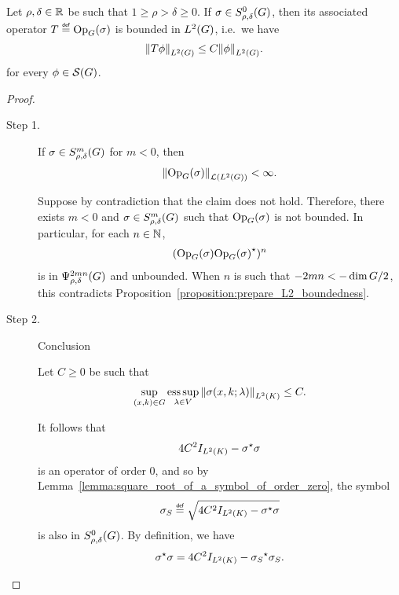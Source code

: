 \begin{proposition}[$L^2$ boundedness]
\label{proposition:L2_boundedness}
    Let $\rho, \delta \in \R$ be such that $1 \geq \rho > \delta \geq 0$.
    If $\sigma \in \SymbolClass 0 {\rho, \delta}$,
    then its associated operator $T \defeq \Op(\sigma)$ is bounded in $\Lebesgue 2 \Group$,
    i.e.\ we have
    \begin{align*}
        \norm [\Lebesgue 2 \Group] {T \phi} \leq C \norm [\Lebesgue 2 \Group] \phi.
    \end{align*}
    for every $\phi \in \Schwartz \Group$.
\end{proposition}
\begin{proof}
    \begin{description}
        \item[Step 1.] If $\sigma \in \SymbolClass m {\rho, \delta}$ for $m < 0$, then
            \begin{align*}
                \norm [\Lin{\Lebesgue 2 \Group}] {\Op(\sigma)} < \infty.
            \end{align*}

            Suppose by contradiction that the claim does not hold.
            Therefore, there exists $m < 0$ and $\sigma \in \SymbolClass m {\rho, \delta}$ such that
            $\Op(\sigma)$ is not bounded.
            In particular, for each $n \in \N$,
            \begin{align*}
                (\Op(\sigma) \adj {\Op(\sigma)})^n
            \end{align*}
            is in $\OperatorClass {2 m n} {\rho, \delta}$ and unbounded.
            When $n$ is such that $-2 m n < -\dim \Group / 2$, this contradicts
            Proposition~\ref{proposition:prepare_L2_boundedness}.
        \item[Step 2.] Conclusion

            Let $C \geq 0$ be such that
            \begin{align*}
                \sup_{(x, k) \in \Group} \esssup_{\lambda \in \VectorSpace} \norm [\Lebesgue 2 \CompactGroup] {\sigma(x, k; \lambda)} \leq C.
            \end{align*}

            It follows that
            \begin{align*}
                4 C^2 \Id {\Lebesgue 2 \CompactGroup} - \adj \sigma \sigma
            \end{align*}
            is an operator of order $0$,
            and so by Lemma~\ref{lemma:square_root_of_a_symbol_of_order_zero}, the symbol
            \begin{align*}
                \sigma_S \defeq \sqrt{4 C^2 \Id {\Lebesgue 2 \CompactGroup} - \adj \sigma \sigma}
            \end{align*}
            is also in $\SymbolClass 0 {\rho, \delta}$.
            By definition, we have
            \begin{align}
                \adj \sigma \sigma = 4 C^2 \Id {\Lebesgue 2 \CompactGroup} - \adj {\sigma_S} \sigma_S.
                \label{eq:decomposition_of_unity_in_terms_of_symbols_squared}
            \end{align}


\end{description}
\end{proof}
